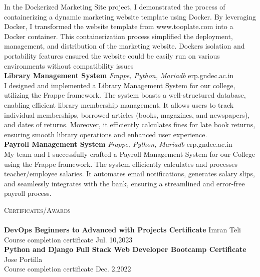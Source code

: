 \documentclass[a4paper]{article}
\newcommand{\lineunder} {
    \vspace*{-8pt} \\
    \hspace*{-18pt} \hrulefill \\
}
\newcommand{\header} [1] {
    {\hspace*{-18pt}\vspace*{6pt} \textsc{#1}}
    \vspace*{-6pt} \lineunder
}
\begin{document}
In the Dockerized Marketing Site project, I demonstrated the process of containerizing a dynamic marketing website template using Docker. By leveraging Docker, I transformed the website template from www.tooplate.com into a Docker container. This containerization process simplified the deployment, management, and distribution of the marketing website. Docker\textquotesingle{}s isolation and portability features ensured the website could be easily run on various environments without compatibility issues\\
\vspace*{2mm}
{\textbf{Library Management System}} {\sl Frappe, Python, Mariadb} \hfill erp.gndec.ac.in\\
I designed and implemented a Library Management System for our college, utilizing the Frappe framework. The system boasts a well-structured database, enabling efficient library membership management. It allows users to track individual memberships, borrowed articles (books, magazines, and newspapers), and dates of returns. Moreover, it efficiently calculates fines for late book returns, ensuring smooth library operations and enhanced user experience.\\
\vspace*{2mm}
{\textbf{Payroll Management System}} {\sl Frappe, Python, Mariadb} \hfill erp.gndec.ac.in\\
My team and I successfully crafted a Payroll Management System for our College using the Frappe framework. The system efficiently calculates and processes teacher/employee salaries. It automates email notifications, generates salary slips, and seamlessly integrates with the bank, ensuring a streamlined and error-free payroll process.\\
\vspace*{2mm}

\header{Certificates/Awards}
\textbf{DevOps Beginners to Advanced with Projects Certificate} \hfill Imran Teli\\
Course completion certificate \hfill Jul. 10,2023\\
\vspace*{2mm}
\textbf{Python and Django Full Stack Web Developer Bootcamp Certificate} \hfill Jose Portilla\\
Course completion certificate \hfill Dec. 2,2022\\
\vspace*{2mm}

\ 
\end{document}
